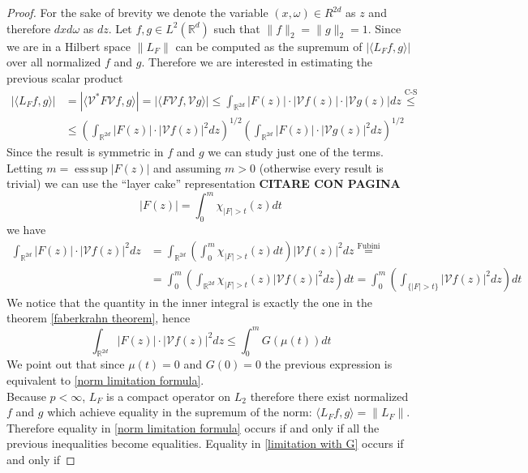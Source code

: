 \documentclass[corpo=11pt, stile=classica, tipotesi=custom,
greek, evenboxes, english]{toptesi}
\numberwithin{equation}{chapter}
\newcommand{\R}{\mathbb{R}} %
\newcommand{\V}{\mathcal{V}} %
\DeclareMathOperator*{\esssup}{ess\,sup}
\begin{document}
\begin{proof}
	For the sake of brevity we denote the variable $(x,\omega) \in R^{2d}$ as $z$ and therefore $dxd\omega$ as $dz$. Let $f,g \in L^2(\R^d)$ such that $\| f \|_2 = \| g \|_2 = 1$.
	Since we are in a Hilbert space $\| L_F \|$ can be computed as the supremum of $|\langle L_F f,g \rangle|$ over all normalized $f$ and $g$. Therefore we are interested in estimating the previous scalar product
	\begin{equation}\label{first inequality}
	\begin{aligned}
		| \langle L_F f, g \rangle |  &= | \langle \V^* F \V f, g \rangle | = | \langle F \V f, \V g \rangle | \leq \int_{\R^{2d}} |F(z)| \cdot |\V f(z)| \cdot | \V g(z) | dz \overset{\text{C-S}}{\leq} \\
									  &\leq \left( \int_{\R^{2d}} |F(z)| \cdot |\V f(z)|^2 dz \right)^{1/2} \left( \int_{\R^{2d}} |F(z)| \cdot |\V g(z)|^2 dz \right)^{1/2} 
	\end{aligned}
	\end{equation}
	Since the result is symmetric in $f$ and $g$ we can study just one of the terms. Letting $m = \esssup |F(z)|$ and assuming $m>0$ (otherwise every result is trivial) we can use the ``layer cake'' representation \textbf{CITARE CON PAGINA}
	\begin{equation*}
		|F(z)| = \int_0^m \chi_{|F|>t}(z)dt 
	\end{equation*}
	we have
	\begin{align*}
		\int_{\R^{2d}} |F(z)| \cdot |\V f(z)|^2 dz &= \int_{\R^{2d}} \left( \int_0^m \chi_{|F|>t}(z)dt \right) |\V f(z)|^2 dz \overset{\text{Fubini}}{=}\\
											 &= \int_0^m \left( \int_{\R^{2d}} \chi_{|F|>t}(z) |\V f(z)|^2 dz \right)dt = \int_0^m \left( \int_{\{|F|>t\}} |\V f(z)|^2 dz \right)dt
	\end{align*}
	We notice that the quantity in the inner integral is exactly the one in the theorem \ref{faberkrahn theorem}, hence
	\begin{equation}\label{limitation with G}
		\int_{\R^{2d}} |F(z)| \cdot |\V f(z)|^2 dz \leq \int_0^m G(\mu(t)) dt
	\end{equation}
	We point out that since $\mu(t) = 0$ and $G(0)=0$ the previous expression is equivalent to \eqref{norm limitation formula}.\\
	Because $p<\infty$, $L_F$ is a compact operator on $L_2$ therefore there exist normalized $f$ and $g$ which achieve equality in the supremum of the norm: $\langle L_F f, g \rangle = \| L_F \|$. Therefore equality in \eqref{norm limitation formula} occurs if and only if all the previous inequalities become equalities. Equality in \eqref{limitation with G} occurs if and only if

\end{proof}
\end{document}
